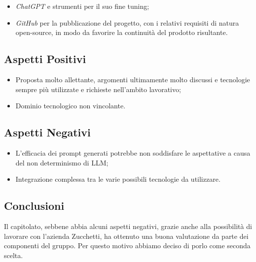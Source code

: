 \documentclass{article}
\begin{document}
\begin{itemize}
    \item \textit{ChatGPT} e strumenti per il suo fine tuning;
    \item \textit{GitHub} per la pubblicazione del progetto, con i relativi requisiti di natura open-source, in modo da favorire la continuità del prodotto risultante.

\end{itemize}

\subsection{Aspetti Positivi}
\begin{itemize}
    \item Proposta molto allettante, argomenti ultimamente molto discussi e tecnologie sempre più utilizzate e richieste nell’ambito lavorativo;
    \item Dominio tecnologico non vincolante.

\end{itemize}

\subsection{Aspetti Negativi}
\begin{itemize}
    \item L’efficacia dei prompt generati potrebbe non soddisfare le aspettative a causa del non determinismo di LLM;
    \item Integrazione complessa tra le varie possibili tecnologie da utilizzare.

\end{itemize}
\subsection{Conclusioni}
Il capitolato, sebbene abbia alcuni aspetti negativi, grazie anche alla possibilità di lavorare con l’azienda Zucchetti, ha ottenuto una buona valutazione da parte dei componenti del gruppo. Per questo motivo abbiamo deciso di porlo come seconda scelta.
\end{document}
